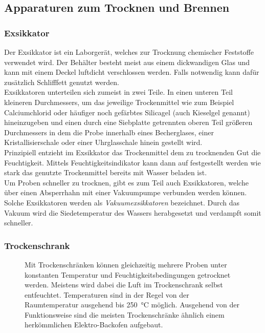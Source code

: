 \subsection{Apparaturen zum Trocknen und Brennen}
\subsubsection*{Exsikkator}
Der Exsikkator ist ein Laborgerät, welches zur Trocknung chemischer Feststoffe verwendet wird. Der Behälter besteht meist aus einem dickwandigen Glas und kann mit einem Deckel luftdicht verschlossen werden. Falls notwendig kann dafür zusätzlich Schlifffett genutzt werden.\\
Exsikkatoren unterteilen sich zumeist in zwei Teile. In einen unteren Teil kleineren Durchmessers, um das jeweilige Trockenmittel wie zum Beispiel Calciumchlorid oder häufiger noch gefärbtes Silicagel (auch Kieselgel genannt) hineinzugeben und einen durch eine Siebplatte getrennten oberen Teil größeren Durchmessers in dem die Probe innerhalb eines Becherglases, einer Kristallisierschale oder einer Uhrglasschale hinein gestellt wird.\\
Prinzipiell entzieht im Exsikkator das Trockenmittel dem zu trocknenden Gut die Feuchtigkeit. Mittels Feuchtigkeitsindikator kann dann auf festgestellt werden wie stark das genutzte Trockenmittel bereits mit Wasser beladen ist.\\ 
Um Proben schneller zu trocknen, gibt es zum Teil auch Exsikkatoren, welche über einen Absperrhahn mit einer Vakuumpumpe verbunden werden können. Solche Exsikkatoren werden als \textit{Vakuumexsikkatoren} bezeichnet. Durch das Vakuum wird die Siedetemperatur des Wassers herabgesetzt und verdampft somit schneller.


\subsubsection*{Trockenschrank}
\begin{figure}[h!]
	\begin{minipage}[t]{0.65\textwidth}
		\vspace{0pt}
		Mit Trockenschränken können gleichzeitig mehrere Proben unter konstanten Temperatur und Feuchtigkeitsbedingungen getrocknet werden. Meistens wird dabei die Luft im Trockenschrank selbst entfeuchtet. Temperaturen sind in der Regel von der Raumtemperatur ausgehend bis \SI{250}{\celsius} möglich. Ausgehend von der Funktionsweise sind die meisten Trockenschränke ähnlich einem herkömmlichen Elektro-Backofen aufgebaut. 
	\end{minipage}
	\hfill
	\hspace{1mm}
	\begin{minipage}[t]{0.3\textwidth}
	\end{minipage}
\end{figure}
\FloatBarrier

